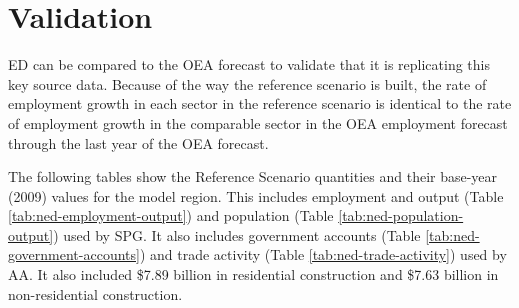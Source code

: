 \section{Validation} 
ED can be compared to the OEA forecast to validate that it is replicating this key source data. Because of the way the reference scenario is built, the rate of employment growth in each sector in the reference scenario is identical to the rate of employment growth in the comparable sector in the OEA employment forecast through the last year of the OEA forecast. 

The following tables show the Reference Scenario quantities and their base-year (2009) values for the model region. This includes employment and output (Table \ref{tab:ned-employment-output}) and population (Table \ref{tab:ned-population-output}) used by SPG. It also includes government accounts (Table \ref{tab:ned-government-accounts}) and trade activity (Table \ref{tab:ned-trade-activity}) used by AA. It also included \$7.89 billion in residential construction and \$7.63 billion in non-residential construction.

